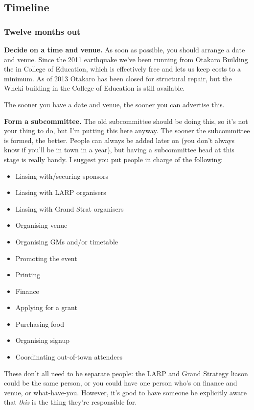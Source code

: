 \subsection{Timeline}

\subsubsection{Twelve months out}

\textbf{Decide on a time and venue.} As soon as possible, you should arrange a date and venue. Since the 2011 earthquake we've been running from Otakaro Building the in College of Education, which is effectively free and lets us keep costs to a minimum. As of 2013 Otakaro has been closed for structural repair, but the Wheki building in the College of Education is still available.

The sooner you have a date and venue, the sooner you can advertise this.

\textbf{Form a subcommittee.} The old subcommittee should be doing this, so it's not your thing to do, but I'm putting this here anyway. The sooner the subcommittee is formed, the better. People can always be added later on (you don't always know if you'll be in town in a  year), but having a subcommittee head at this stage is really handy. I suggest you put people in charge of the following:

\begin{itemize}
  \item Liasing with/securing sponsors
  \item Liasing with LARP organisers
  \item Liasing with Grand Strat organisers
  \item Organising venue
  \item Organising GMs and/or timetable
  \item Promoting the event
  \item Printing
  \item Finance
  \item Applying for a grant
  \item Purchasing food \etc
  \item Organising signup
  \item Coordinating out-of-town attendees
\end{itemize}

These don't all need to be separate people: the LARP and Grand Strategy liason could be the same person, or you could have one person who's on finance and venue, or what-have-you. However, it's good to have someone be explicitly aware that \textit{this} is the thing they're responsible for.

